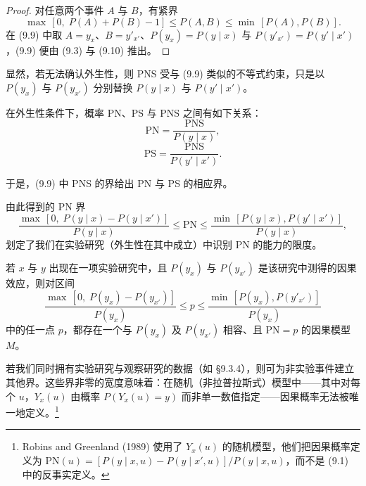 \begin{proof}
对任意两个事件 $A$ 与 $B$，有紧界
\begin{equation}
\max\,[0,\;P(A)+P(B)-1]\le P(A,B)\le\min\,[P(A),P(B)]. \tag{9.10}
\end{equation}
在 \textup{(9.9)} 中取 $A=y_x$、$B=y'_{x'}$、$P(y_x)=P(y\mid x)$ 与 $P(y'_{x'})=P(y'\mid x')$，\textup{(9.9)} 便由 \textup{(9.3)} 与 \textup{(9.10)} 推出。
\end{proof}

显然，若无法确认外生性，则 PNS 受与 \textup{(9.9)} 类似的不等式约束，只是以 $P(y_x)$ 与 $P(y_{x'})$ 分别替换 $P(y\mid x)$ 与 $P(y'\mid x')$。

\begin{theorem}
在外生性条件下，概率 PN、PS 与 PNS 之间有如下关系：
\begin{equation}
\mathrm{PN}=\frac{\mathrm{PNS}}{P(y\mid x)}, \tag{9.11}
\end{equation}
\begin{equation}
\mathrm{PS}=\frac{\mathrm{PNS}}{P(y'\mid x')}. \tag{9.12}
\end{equation}
\end{theorem}

于是，\textup{(9.9)} 中 PNS 的界给出 PN 与 PS 的相应界。

由此得到的 PN 界
\begin{equation}
\frac{\max\,[0,\;P(y\mid x)-P(y\mid x')]}{P(y\mid x)}\le\mathrm{PN}\le\frac{\min\,[P(y\mid x),P(y'\mid x')]}{P(y\mid x)}, \tag{9.13}
\end{equation}
划定了我们在实验研究（外生性在其中成立）中识别 PN 的能力的限度。

\begin{corollary}
若 $x$ 与 $y$ 出现在一项实验研究中，且 $P(y_x)$ 与 $P(y_{x'})$ 是该研究中测得的因果效应，则对区间
\begin{equation}
\frac{\max\,[0,\;P(y_x)-P(y_{x'})]}{P(y_x)}\le p\le\frac{\min\,[P(y_x),P(y'_{x'})]}{P(y_x)} \tag{9.14}
\end{equation}
中的任一点 $p$，都存在一个与 $P(y_x)$ 及 $P(y_{x'})$ 相容、且 $\mathrm{PN}=p$ 的因果模型 $M$。
\end{corollary}

若我们同时拥有实验研究与观察研究的数据（如 \S 9.3.4），则可为非实验事件建立其他界。这些界非零的宽度意味着：在随机（非拉普拉斯式）模型中——其中对每个 $u$，$Y_x(u)$ 由概率 $P(Y_x(u)=y)$ 而非单一数值指定——因果概率无法被唯一地定义。\footnote{Robins and Greenland (1989) 使用了 $Y_x(u)$ 的随机模型，他们把因果概率定义为 $\mathrm{PN}(u)=[P(y\mid x,u)-P(y\mid x',u)]/P(y\mid x,u)$，而不是 \textup{(9.1)} 中的反事实定义。}

